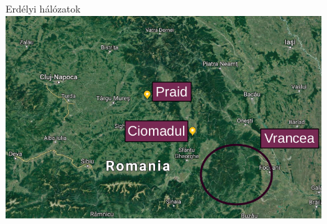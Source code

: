 \documentclass{beamer}
\begin{document}
\begin{frame}{Erdélyi hálózatok}
\includegraphics[width=0.9\textwidth]{praid_ciomadul.png}
\end{frame}
\end{document}
